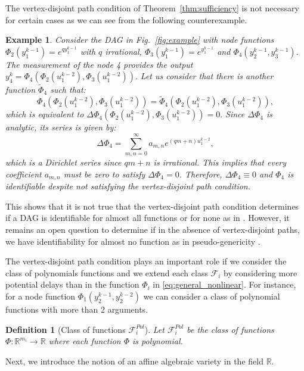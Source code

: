 \documentclass[letterpaper,10pt,journal]{IEEEtran}
\newcommand{\F}{\mathcal{F}}
\newcommand{\Fthree}{\mathcal{F}^{Pol}}
\newtheorem{definition}{Definition}
\newtheorem{example}{Example}
\newcommand{\R}{\mathbb R}
\begin{document}
The vertex-disjoint path condition of Theorem~\ref{thm:sufficiency} is not necessary for certain cases as we can see from the following counterexample. 

\begin{example}\label{ex:Dirichlet}
  Consider the DAG in Fig.~\ref{fig:example} with node functions $\Phi_2(y_1^{k-1})=e^{qy_1^{k-1}}$ with $q$ irrational, $\Phi_3(y_1^{k-1})=e^{y_1^{k-1}}$ and $\Phi_4(y_2^{k-1},y_3^{k-1})$. The measurement of the node 4 provides the output
$
y_4^k=\Phi_4(\Phi_2(u_1^{k-2}),\Phi_3(u_1^{k-2})).
$
Let us consider that there is another function $\tilde \Phi_4$ such that:
$$
\Phi_4(\Phi_2(u_1^{k-2}),\Phi_3(u_1^{k-2}))=\tilde \Phi_4(\Phi_2(u_1^{k-2}),\Phi_3(u_1^{k-2})),
$$
which is equivalent to
$
\Delta \Phi_4(\Phi_2(u_1^{k-2}),\Phi_3(u_1^{k-2}))=0.
$
Since $\Delta \Phi_4$ is analytic, its series is given by:
$$
\Delta \Phi_4 =\sum_{m,n=0}^\infty a_{m,n} e^{(qm+n)u_1^{k-2}},
$$
which is a Dirichlet series since $qm+n$ is irrational. This implies that every coefficient $a_{m,n}$ must be zero to satisfy $\Delta \Phi_4=0$. Therefore, $\Delta \Phi_4\equiv 0$ and $\Phi_4$ is identifiable despite not satisfying the vertex-disjoint path condition.
\end{example}

This shows that it is not true that the vertex-disjoint path condition determines if a DAG is identifiable for almost all functions or for none as in \cite{hendrickx2019identifiability}. However, it remains an open question to determine if in the absence of vertex-disjoint paths, we have identifiability for almost no function as in pseudo-genericity \cite{legat2024identifiability}. 


 
The vertex-disjoint path condition plays an important role if we consider the class of polynomials functions and we extend each class $\F_i$ by considering more potential delays than in the function $\Phi_i$ in \eqref{eq:general_nonlinear}. For instance, for a node function $\Phi_1(y_2^{k-1},y_2^{k-2})$ we can consider a class of polynomial functions with more than 2 arguments.


\begin{definition}[Class of functions $\Fthree_i$]\label{def:class_Fthree} Let $\Fthree_i$ be the class of functions $\Phi:\R^{m_i}\to\R$ where each function $\Phi$ is polynomial.
\end{definition}


Next, we introduce the notion of an affine algebraic variety in the field $\R$.
\end{document}
